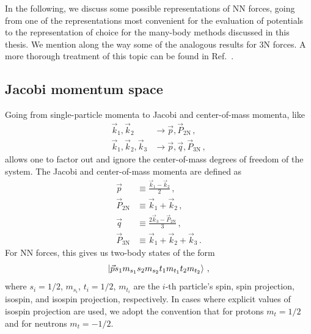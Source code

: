 In the following, we discuss some possible representations of NN forces,
going from one of the representations most convenient for the evaluation of potentials
to the representation of choice for the many-body methods discussed in this thesis.
We mention along the way some of the analogous results for 3N forces.
A more thorough treatment of this topic can be found in Ref.~\cite{Hebe20habi}.

\subsection{Jacobi momentum space}\label{sec:jacobi_ms_rep}

Going from single-particle momenta to Jacobi and center-of-mass momenta,
like
\begin{align}
  \vec{k}_1, \vec{k}_2           & \rightarrow \vec{p}, \vec{P}_{2\text{N}}\,,           \\
  \vec{k}_1, \vec{k}_2,\vec{k}_3 & \rightarrow \vec{p}, \vec{q}, \vec{P}_{3\text{N}} \,,
\end{align}
allows one to factor out and ignore the center-of-mass degrees of freedom of the system.
The Jacobi and center-of-mass momenta are defined as
\begin{align}
  \vec{p}             & \equiv \frac{\vec{k}_1 - \vec{k}_2}{2}\,,            \\
  \vec{P}_{2\text{N}} & \equiv \vec{k}_1 + \vec{k}_2\,,                      \\
  \vec{q}             & \equiv \frac{2\vec{k}_3 - \vec{P}_{2\text{N}}}{3}\,, \\
  \vec{P}_{3\text{N}} & \equiv \vec{k}_1 + \vec{k}_2 + \vec{k}_3\,.
\end{align}
For NN forces, this gives us two-body states of the form
\begin{equation}
  \ket{\vec{p} s_1 m_{s_1} s_2 m_{s_2} t_1 m_{t_1} t_2 m_{t_2}}\,,
\end{equation}
where $s_i=1/2$, $m_{s_i}$, $t_i=1/2$, $m_{t_i}$ are the $i$-th particle's
spin, spin projection, isospin, and isospin projection, respectively.
In cases where explicit values of isospin projection are used,
we adopt the convention that for protons $m_t=1/2$ and for neutrons $m_t=-1/2$.

